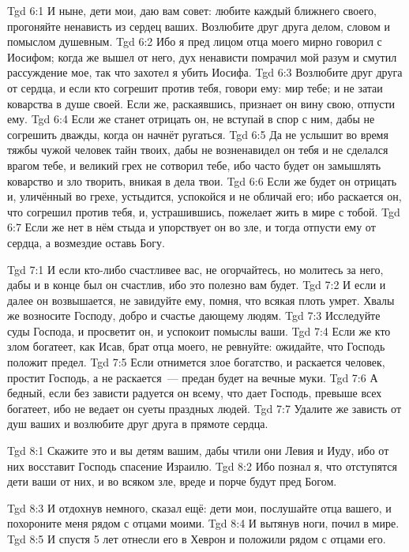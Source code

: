 \vs Tgd 6:1
И ныне, дети мои, даю вам совет:
любите каждый ближнего своего, прогоняйте ненависть из сердец ваших.
Возлюбите друг друга делом, словом и помыслом душевным.
\vs Tgd 6:2
Ибо я пред лицом отца моего мирно говорил с Иосифом;
когда же вышел от него, дух ненависти помрачил мой разум
и смутил рассуждение мое, так что захотел я убить Иосифа.
\vs Tgd 6:3
Возлюбите друг друга от сердца, и если кто согрешит против тебя,
говори ему: мир тебе; и не затаи коварства в душе своей.
Если же, раскаявшись, признает он вину свою, отпусти ему.
\vs Tgd 6:4
Если же станет отрицать он, не вступай в спор с ним,
дабы не согрешить дважды, когда он начнёт ругаться.
\vs Tgd 6:5
Да не услышит во время тяжбы чужой человек тайн твоих,
дабы не возненавидел он тебя и не сделался врагом тебе,
и великий грех не сотворил тебе, ибо часто будет
он замышлять коварство и зло творить, вникая в дела твои.
\vs Tgd 6:6
Если же будет он отрицать и, уличённый во грехе,
устыдится, успокойся и не обличай его;
ибо раскается он, что согрешил против тебя,
и, устрашившись, пожелает жить в мире с тобой.
\vs Tgd 6:7
Если же нет в нём стыда и упорствует он во зле,
и тогда отпусти ему от сердца, а возмездие оставь Богу.

\vs Tgd 7:1
И если кто-либо счастливее вас, не огорчайтесь,
но молитесь за него, дабы и в конце был он счастлив,
ибо это полезно вам будет.
\vs Tgd 7:2
И если и далее он возвышается, не завидуйте ему,
помня, что всякая плоть умрет.
Хвалы же возносите Господу,
добро и счастье дающему людям.
\vs Tgd 7:3
Исследуйте суды Господа, и просветит он,
и успокоит помыслы ваши.
\vs Tgd 7:4
Если же кто злом богатеет, как Исав, брат отца моего,
не ревнуйте: ожидайте, что Господь положит предел.
\vs Tgd 7:5
Если отнимется злое богатство, и раскается человек,
простит Господь, а не раскается~--- предан будет на вечные муки.
\vs Tgd 7:6
А бедный, если без зависти радуется он всему,
что дает Господь, превыше всех богатеет,
ибо не ведает он суеты праздных людей.
\vs Tgd 7:7
Удалите же зависть от душ ваших и возлюбите друг друга в прямоте сердца.

\vs Tgd 8:1
Скажите это и вы детям вашим, дабы чтили они Левия и Иуду,
ибо от них восставит Господь спасение Израилю.
\vs Tgd 8:2
Ибо познал я, что отступятся дети ваши от них,
и во всяком зле, вреде и порче будут пред Богом.

\vs Tgd 8:3
И отдохнув немного, сказал ещё:
дети мои, послушайте отца вашего,
и похороните меня рядом с отцами моими.
\vs Tgd 8:4
И вытянув ноги, почил в мире.
\vs Tgd 8:5
И спустя 5 лет отнесли его в Хеврон и положили рядом с отцами его.
